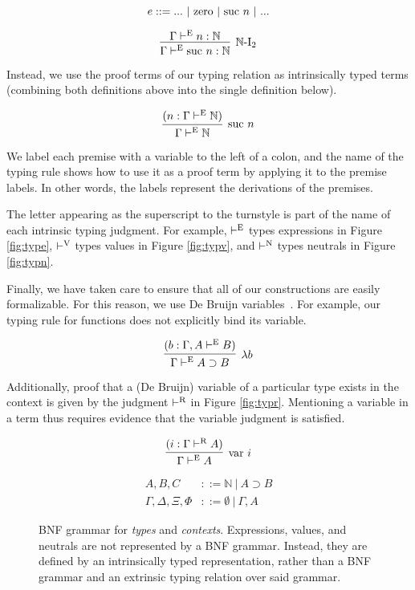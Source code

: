 \documentclass[runningheads,a4paper]{llncs}
\newcommand{\reffig}[1]{Figure \ref{fig:#1}}
\def\arr{\supset}
\def\lam{\lambda}
\def\nat{\mathbb{N}}
\def\emp{\emptyset}
\newcommand{\turn}[1]{\vdash^\con{#1}}
\newcommand{\con}[1]{\textmd{#1}}
\newcommand{\fun}[1]{\textmd{#1}}
\newcommand{\type}[1]{\Gamma \turn{E} #1}
\newcommand{\ctype}[2]{\Gamma , #1 \turn{E} #2}
\newcommand{\typr}[1]{\Gamma \turn{R} #1}
\begin{document}
$$
e ::= ... ~ | ~ \con{zero} ~ | ~ \con{suc} ~ n ~ | ~ ...
$$

$$
\infer
  [\nat\con{-I}_2]
  {\Gamma \turn{E} \con{suc} ~ n : \nat}
{
  \Gamma \turn{E} n : \nat
}
$$

Instead, we use the proof terms of our typing relation as
intrinsically typed terms (combining both definitions above into the
single definition below).

$$
\infer
  [\con{suc} ~ n]
  {\type{\nat}}
{
  (n : \type{\nat})
}
$$

We label each premise with a variable to
the left of a colon, and the name of the typing rule shows how to use
it as a proof term by applying it to the premise labels. In other
words, the labels represent the derivations of the premises.

The letter appearing as the superscript to the turnstyle is part of
the name of each intrinsic typing judgment. For example, $\turn{E}$
types expressions in \reffig{type}, $\turn{V}$ types values in
\reffig{typv}, and $\turn{N}$ types neutrals in \reffig{typn}.

Finally, we have taken care to ensure that all of our constructions
are easily formalizable. For this reason, we
use De Bruijn variables~\cite{debruijn}. For example, our typing rule
for functions does not explicitly bind its variable.

$$
\infer
  [\lam b]
  {\type{A \arr B}}
{
  (b : \ctype{A}{B})
}
$$

Additionally, proof that a (De Bruijn) variable of a particular type
exists in the context is given by the judgment $\turn{R}$ in
\reffig{typr}. Mentioning a variable in a term thus requires evidence
that the variable judgment is satisfied.

$$
\infer
  [\fun{var} ~ i]
  {\type{A}}
{
  (i : \typr{A})
}
$$

\begin{figure}[t!]
\caption{
BNF grammar for \textit{types} and \textit{contexts}. 
Expressions, values, and neutrals
are not represented by a BNF grammar. Instead, they are defined by
an intrinsically typed representation, rather than a BNF grammar and
an extrinsic typing relation over said grammar.
}
\begin{align*}
A, B, C &::= \nat ~ | ~ A \arr B \\
\Gamma, \Delta, \Xi, \Phi &::= \emp ~ | ~ \Gamma , A
\end{align*}
\label{fig:gram}
\end{figure}
\end{document}
